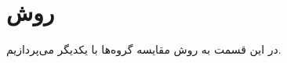 \documentclass{article}
\begin{document}
\section{روش}
در این قسمت به روش مقایسه گروه‌ها با یکدیگر می‌پردازیم.
\end{document}
